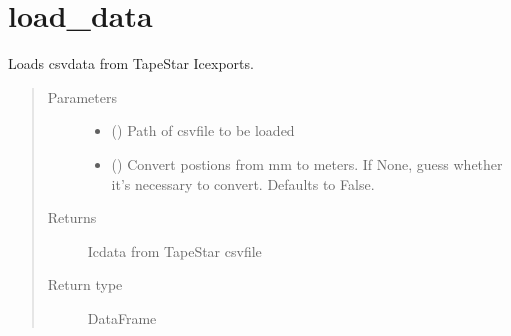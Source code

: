 \documentclass[letterpaper,10pt,english]{sphinxmanual}
\begin{document}
\section{load\_data}
\label{\detokenize{generated/quality_assessment.helper.load_data:load-data}}\label{\detokenize{generated/quality_assessment.helper.load_data::doc}}

\begin{fulllineitems}
\label{\detokenize{generated/quality_assessment.helper.load_data:quality_assessment.helper.load_data}}
\sphinxAtStartPar
Loads csv\sphinxhyphen{}data from TapeStar Ic\sphinxhyphen{}exports.
\begin{quote}\begin{description}
\item[{Parameters}] \leavevmode\begin{itemize}
\item {} 
\sphinxAtStartPar
{} () \textendash{} Path of csv\sphinxhyphen{}file to be loaded

\item {} 
\sphinxAtStartPar
{} (\sphinxstyleliteralemphasis{\sphinxupquote{, }}) \textendash{} Convert postions from mm to
meters. If None, guess whether it’s necessary to convert.
Defaults to False.

\end{itemize}

\item[{Returns}] \leavevmode
\sphinxAtStartPar
Ic\sphinxhyphen{}data from TapeStar csv\sphinxhyphen{}file

\item[{Return type}] \leavevmode
\sphinxAtStartPar
DataFrame

\end{description}\end{quote}

\end{fulllineitems}
\end{document}
